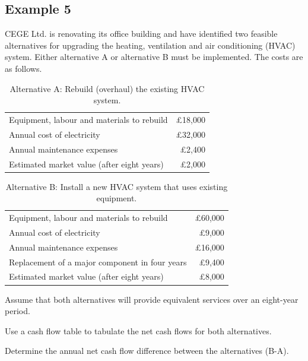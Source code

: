 \subsection{Example 5}
CEGE Ltd. is renovating its office building and have identified two feasible alternatives for upgrading the heating, ventilation and air conditioning (HVAC) system. Either alternative A or alternative B must be implemented. The costs are as follows.
\begin{table}[H]
    \centering
    \begin{tabular}{@{}lr@{}}
        \toprule
        Equipment, labour and materials to rebuild & \pounds 18,000 \\
        Annual cost of electricity                 & \pounds 32,000 \\
        Annual maintenance expenses                & \pounds 2,400  \\
        Estimated market value (after eight years) & \pounds 2,000  \\
        \bottomrule
    \end{tabular}
    \caption{Alternative A: Rebuild (overhaul) the existing HVAC system.}
\end{table}
\begin{table}[H]
    \centering
    \begin{tabular}{@{}lr@{}}
        \toprule
        Equipment, labour and materials to rebuild     & \pounds 60,000 \\
        Annual cost of electricity                     & \pounds 9,000  \\
        Annual maintenance expenses                    & \pounds 16,000 \\
        Replacement of a major component in four years & \pounds 9,400  \\
        Estimated market value (after eight years)     & \pounds 8,000  \\
        \bottomrule
    \end{tabular}
    \caption{Alternative B: Install a new HVAC system that uses existing equipment.}
\end{table}
Assume that both alternatives will provide equivalent services over an eight-year period.
\begin{quoting}
    Use a cash flow table to tabulate the net cash flows for both alternatives.
\end{quoting}
\begin{quoting}
    Determine the annual net cash flow difference between the alternatives (B-A).
\end{quoting}
